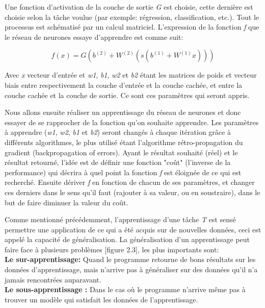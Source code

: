 	Une fonction d'activation de la couche de sortie \textit{G} est choisie, cette dernière est choisie selon la tâche voulue (par exemple: régression, classification, etc.).
Tout le processus est schématisé par un calcul matriciel. L’expression de la fonction \textit{f} que le réseau de neurones essaye d'apprendre est comme suit:

$$f(x) = G( b^{(2)} + W^{(2)}( s( b^{(1)} + W^{(1)} x)))$$

	Avec \textit{x} vecteur d'entrée et \textit{w1}, \textit{ b1}, \textit{w2} et \textit{b2} étant les matrices de poids et vecteur biais entre respectivement la couche d'entrée et la couche cachée, et entre la couche cachée et la couche de sortie. Ce sont ces paramètres qui seront appris.
	
	Nous allons ensuite réaliser un apprentissage du réseau de neurones et donc essayer de se rapprocher de la fonction qu'on souhaite apprendre. Les paramètres à apprendre (\textit{w1}, \textit{ w2}, \textit{b1} et \textit{b2}) seront changés à chaque itération grâce à différents algorithmes, le plus utilisé étant l'algorithme rétro-propagation du gradient (backpropagation of errors). 
	Ayant le résultat souhaité (réel) et le résultat retourné, l'idée est de définir une fonction "coût" (l'inverse de la performance) qui décrira à quel point la fonction \textit{f} est éloignée de ce qui est recherché. Ensuite dériver \textit{f} en fonction de chacun de ses paramètres, et changer ces derniers dans le sens qu'il faut (rajouter à sa valeur, ou en soustraire), dans le but de faire diminuer la valeur du coût.

	Comme mentionné précédemment, l'apprentissage d'une tâche \textit{T} est sensé permettre une application de ce qui a été acquis sur de nouvelles données, ceci est appelé la capacité de généralisation. La généralisation d'un apprentissage peut faire face à plusieurs problèmes [figure 2.3], les plus importants sont:\\

\textbf{Le sur-apprentissage:} Quand le programme retourne de bons résultats sur les données d'apprentissage, mais n'arrive pas à généraliser sur des données qu'il n'a jamais rencontrées auparavant.\\

\textbf{Le sous-apprentissage :} Dans le cas où le programme n'arrive même pas à trouver un modèle qui satisfait les données de l'apprentissage.\\


